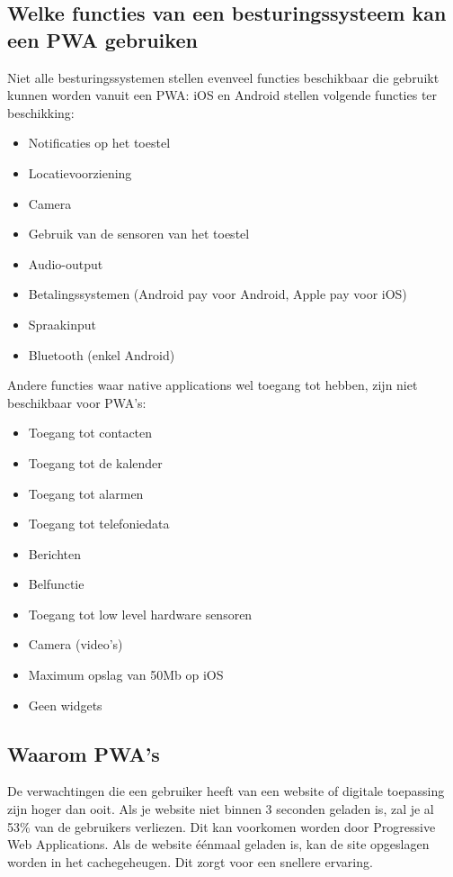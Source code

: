 \subsection{Welke functies van een besturingssysteem kan een PWA gebruiken}
Niet alle besturingssystemen stellen evenveel functies beschikbaar die gebruikt kunnen worden vanuit een PWA: iOS en Android stellen volgende functies ter beschikking:
\begin{itemize}
    \item Notificaties op het toestel
    \item Locatievoorziening
    \item Camera
    \item Gebruik van de sensoren van het toestel
    \item Audio-output
    \item Betalingssystemen (Android pay voor Android, Apple pay voor iOS)
    \item Spraakinput
    \item Bluetooth (enkel Android)
\end{itemize}
Andere functies waar native applications wel toegang tot hebben, zijn niet beschikbaar voor PWA's:
\begin{itemize}
    \item Toegang tot contacten
    \item Toegang tot de kalender
    \item Toegang tot alarmen
    \item Toegang tot telefoniedata
    \item Berichten
    \item Belfunctie
    \item Toegang tot low level hardware sensoren
    \item Camera (video’s)
    \item Maximum opslag van 50Mb op iOS
    \item Geen widgets
\end{itemize}

\autocite{Malavolta2016}
\autocite{Destrebecq2018}

\subsection{Waarom PWA's}

De verwachtingen die een gebruiker heeft van een website of digitale toepassing zijn hoger dan ooit. Als je website niet binnen 3 seconden geladen is, zal je al 53\% van de gebruikers verliezen. Dit kan voorkomen worden door Progressive Web Applications. Als de website éénmaal geladen is, kan de site opgeslagen worden in het cachegeheugen. Dit zorgt voor een snellere ervaring.
\autocite{Google2017}

